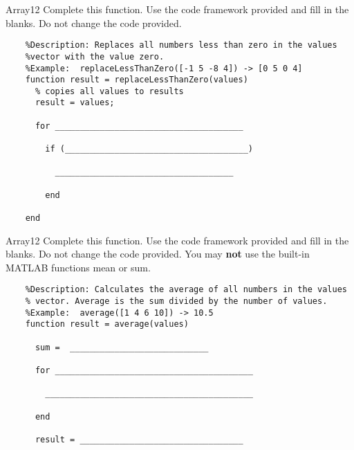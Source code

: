\documentclass[master]{exam}
\begin{document}
\begin{problem}{Array}{12}
    Complete this function. Use the code framework provided and fill in
    the blanks. Do not change the code provided. 

    \begin{verbatim}
    %Description: Replaces all numbers less than zero in the values
    %vector with the value zero.
    %Example:  replaceLessThanZero([-1 5 -8 4]) -> [0 5 0 4]
    function result = replaceLessThanZero(values)
      % copies all values to results
      result = values;

      for ______________________________________

        if (_____________________________________)

          ____________________________________

        end

    end
    \end{verbatim}
\end{problem}

\begin{problem}{Array}{12}
    Complete this function. Use the code framework provided and fill in
    the blanks. Do not change the code provided. You may \textbf{not} use the
    built-in MATLAB functions mean or sum.

    \begin{verbatim}
    %Description: Calculates the average of all numbers in the values
    % vector. Average is the sum divided by the number of values.
    %Example:  average([1 4 6 10]) -> 10.5
    function result = average(values)
      
      sum =  ____________________________
     
      for ________________________________________
       
        __________________________________________
       
      end
     
      result = _________________________________
             
    \end{verbatim}
\end{problem}
\end{document}
